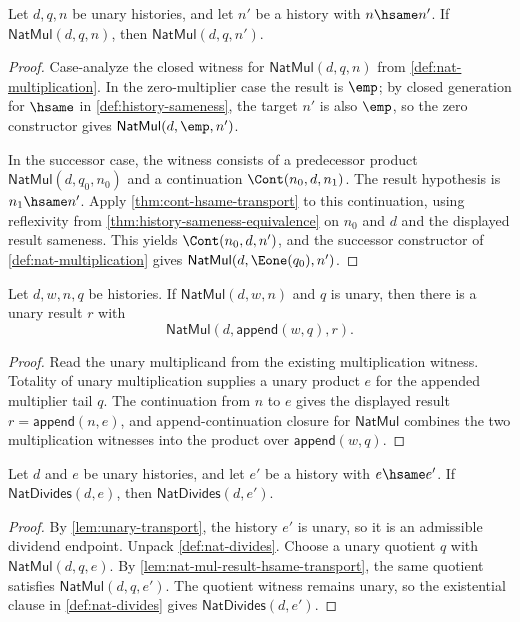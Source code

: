 \begin{lemma}
\label{lem:nat-mul-result-hsame-transport}
Let $d,q,n$ be unary histories, and let $n'$ be a history with $n\hsame n'$. If $\mathsf{NatMul}(d,q,n)$, then $\mathsf{NatMul}(d,q,n')$.
\end{lemma}
\begin{proof}
Case-analyze the closed witness for $\mathsf{NatMul}(d,q,n)$ from \autoref{def:nat-multiplication}. In the zero-multiplier case the result is $\emp$; by closed generation for $\hsame$ in \autoref{def:history-sameness}, the target $n'$ is also $\emp$, so the zero constructor gives $\mathsf{NatMul}(d,\emp,n')$.

In the successor case, the witness consists of a predecessor product $\mathsf{NatMul}(d,q_0,n_0)$ and a continuation $\Cont(n_0,d,n_1)$. The result hypothesis is $n_1\hsame n'$. Apply \autoref{thm:cont-hsame-transport} to this continuation, using reflexivity from \autoref{thm:history-sameness-equivalence} on $n_0$ and $d$ and the displayed result sameness. This yields $\Cont(n_0,d,n')$, and the successor constructor of \autoref{def:nat-multiplication} gives $\mathsf{NatMul}(d,\Eone(q_0),n')$.
\end{proof}

\begin{lemma}
\label{lem:nat-mul-append-multiplier-total}
Let $d,w,n,q$ be histories. If $\mathsf{NatMul}(d,w,n)$ and $q$ is unary, then
there is a unary result $r$ with
$$
\mathsf{NatMul}(d,\mathsf{append}(w,q),r).
$$
\end{lemma}
\begin{proof}
Read the unary multiplicand from the existing multiplication witness. Totality
of unary multiplication supplies a unary product $e$ for the appended
multiplier tail $q$. The continuation from $n$ to $e$ gives the displayed result
$r=\mathsf{append}(n,e)$, and append-continuation closure for
$\mathsf{NatMul}$ combines the two multiplication witnesses into the product
over $\mathsf{append}(w,q)$.
\end{proof}

\begin{theorem}
\label{thm:nat-divides-dividend-hsame-transport}
Let $d$ and $e$ be unary histories, and let $e'$ be a history with $e\hsame e'$. If $\mathsf{NatDivides}(d,e)$, then $\mathsf{NatDivides}(d,e')$.
\end{theorem}
\begin{proof}
By \autoref{lem:unary-transport}, the history $e'$ is unary, so it is an admissible dividend endpoint. Unpack \autoref{def:nat-divides}. Choose a unary quotient $q$ with $\mathsf{NatMul}(d,q,e)$. By \autoref{lem:nat-mul-result-hsame-transport}, the same quotient satisfies $\mathsf{NatMul}(d,q,e')$. The quotient witness remains unary, so the existential clause in \autoref{def:nat-divides} gives $\mathsf{NatDivides}(d,e')$.
\end{proof}

